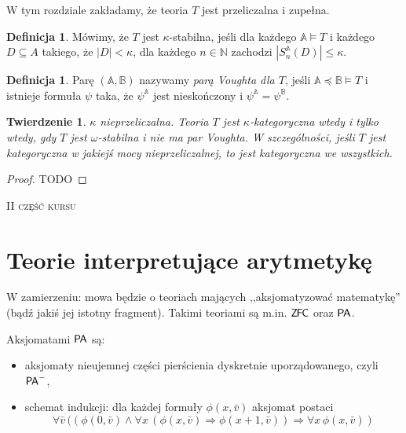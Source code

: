 \documentclass{article}
\newcommand{\N}{\mathbb{N}}
\newcommand{\A}{\mathbb{A}}
\newcommand{\B}{\mathbb{B}}
\theoremstyle{plain}
\newtheorem{tw}[thm]{Twierdzenie}
\theoremstyle{definition}
\newtheorem{df}[thm]{Definicja}
\theoremstyle{remark}
\newcommand{\PA}{\mathsf{P \mkern-1.9mu A}}
\newcommand{\ZFC}{\mathsf{Z \mkern-1.6mu F \mkern-1.5mu C}}
\begin{document}
W tym rozdziale zakładamy, że teoria $T$ jest przeliczalna i zupełna.

\begin{df}
	Mówimy, że $T$ jest $\kappa$-stabilna, jeśli dla każdego $\A \models T$ i każdego $D \subseteq A$ takiego, że $|D| < \kappa$, dla każdego $n \in \N$ zachodzi $|S_n^{\A}(D)| \leq \kappa$.
\end{df}

\begin{df}
	Parę $(\A, \B)$ nazywamy \textit{parą Voughta dla $T$}, jeśli $\A \preccurlyeq \B \models T$ i istnieje formuła $\psi$ taka, że $\psi^{\A}$ jest nieskończony i $\psi^{\A} = \psi^{\B}$.
\end{df}

\begin{tw}
	 $\kappa$ nieprzeliczalna. Teoria $T$ jest $\kappa$-kategoryczna wtedy i tylko wtedy, gdy $T$ jest $\omega$-stabilna i nie ma par Voughta.
	 W szczególności, jeśli $T$ jest kategoryczna w jakiejś mocy nieprzeliczalnej, to jest kategoryczna we wszystkich.
\end{tw}
\begin{proof}
	 TODO
\end{proof}

\vspace{0.5cm}
\begin{center}
{\Large \textsc{II część kursu}}
\end{center}
\vspace{-0.4cm}
\section{Teorie interpretujące arytmetykę}

W zamierzeniu: mowa będzie o teoriach mających ,,aksjomatyzować matematykę'' (bądź jakiś jej istotny fragment).
Takimi teoriami są m.in. $\ZFC$ oraz $\PA$.

Aksjomatami $\PA$ są:
\begin{itemize}
	\item aksjomaty nieujemnej części pierścienia dyskretnie uporządowanego, czyli $\PA^-$,
	\item schemat indukcji: dla każdej formuły $\phi(x, \bar{v})$ aksjomat postaci
		\[
			\forall \bar{v} \, ((\phi(0, \bar{v}) \wedge \forall x \, (\phi(x, \bar{v}) \Rightarrow \phi(x+1, \bar{v}))\Rightarrow \forall x \, \phi(x, \bar{v}))
		\]
\end{itemize}
\end{document}
